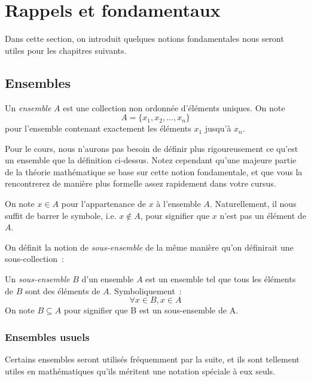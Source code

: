\chapter{Rappels et fondamentaux}

Dans cette section, on introduit quelques notions fondamentales nous seront utiles pour les chapitres suivants.

\section{Ensembles}

\begin{boxdef}[Ensemble]
Un \emph{ensemble} $A$ est une collection non ordonnée d'éléments uniques. On note
\begin{equation}
A = \{x_1, x_2, \ldots, x_n\}
\end{equation}
pour l'ensemble contenant exactement les éléments $x_1$ jusqu'à $x_n$.
\end{boxdef}
Pour le cours, nous n'aurons pas besoin de définir plus rigoureusement ce qu'est un ensemble que la définition ci-dessus. Notez cependant qu'une majeure partie de la théorie mathématique se base sur cette notion fondamentale, et que vous la rencontrerez de manière plus formelle assez rapidement dans votre cursus.

On note $x \in A$ pour l'appartenance de $x$ à l'ensemble $A$. Naturellement, il nous suffit de barrer le symbole, i.e. $x \not\in A$, pour signifier que $x$ n'est pas un élément de $A$.

On définit la notion de \emph{sous-ensemble} de la même manière qu'on définirait une sous-collection~:
\begin{boxdef}
Un \emph{sous-ensemble} $B$ d'un ensemble $A$ est un ensemble tel que tous les éléments de $B$ sont des éléments de $A$. Symboliquement~:
\begin{equation}
\forall x \in B, x \in A
\end{equation}
On note $B \subseteq A$ pour signifier que B est un sous-ensemble de A.
\end{boxdef}

\subsection{Ensembles usuels}
Certains ensembles seront utilisés fréquemment par la suite, et ils sont tellement utiles en mathématiques qu'ils méritent une notation spéciale à eux seuls.

